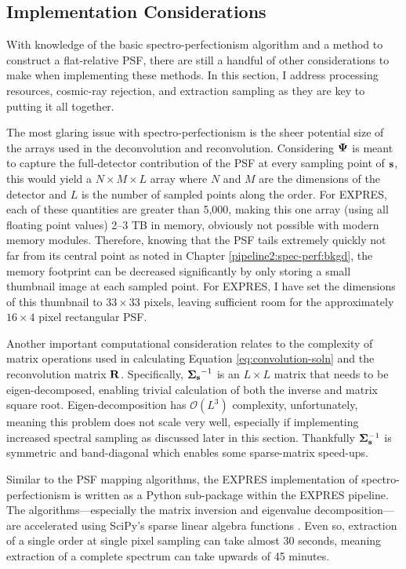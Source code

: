 \subsection{Implementation Considerations} \label{pipeline2:spec-perf:implement}

With knowledge of the basic spectro-perfectionism algorithm and a method to construct a flat-relative PSF, there are still a handful of other considerations to make when implementing these methods. In this section, I address processing resources, cosmic-ray rejection, and extraction sampling as they are key to putting it all together.

The most glaring issue with spectro-perfectionism is the sheer potential size of the arrays used in the deconvolution and reconvolution. Considering $\vb{\Psi}$ is meant to capture the full-detector contribution of the PSF at every sampling point of $\vb{s}$, this would yield a $N \times M \times L$ array where $N$ and $M$ are the dimensions of the detector and $L$ is the number of sampled points along the order. For EXPRES, each of these quantities are greater than 5,000, making this one array (using all floating point values) 2--3 TB in memory, obviously not possible with modern memory modules. Therefore, knowing that the PSF tails extremely quickly not far from its central point as noted in Chapter \ref{pipeline2:spec-perf:bkgd}, the memory footprint can be decreased significantly by only storing a small thumbnail image at each sampled point. For EXPRES, I have set the dimensions of this thumbnail to $33 \times 33$ pixels, leaving sufficient room for the approximately $16 \times 4$ pixel rectangular PSF.

Another important computational consideration relates to the complexity of matrix operations used in calculating Equation \ref{eq:convolution-soln} and the reconvolution matrix $\vb{R}$. Specifically, $\vb{\Sigma_s}^{-1}$ is an $L \times L$ matrix that needs to be eigen-decomposed, enabling trivial calculation of both the inverse and matrix square root. Eigen-decomposition has $\mathcal{O}(L^3)$ complexity, unfortunately, meaning this problem does not scale very well, especially if implementing increased spectral sampling as discussed later in this section. Thankfully $\vb{\Sigma}_{\vb{s}}^{-1}$ is symmetric and band-diagonal which enables some sparse-matrix speed-ups.

Similar to the PSF mapping algorithms, the EXPRES implementation of spectro-perfectionism is written as a Python sub-package within the EXPRES pipeline. The algorithms---especially the matrix inversion and eigenvalue decomposition---are accelerated using SciPy's sparse linear algebra functions \citep{virtanen_scipy_2020}. Even so, extraction of a single order at single pixel sampling can take almost 30 seconds, meaning extraction of a complete spectrum can take upwards of 45 minutes.

